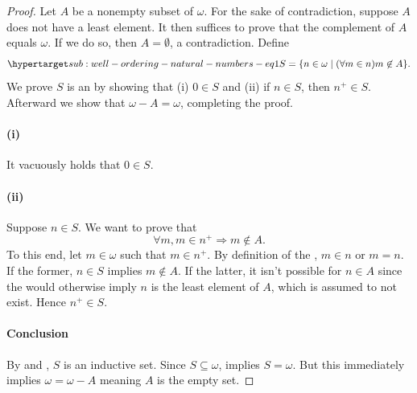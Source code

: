 \documentclass{report}
\begin{document}
  \begin{proof}

    Let $A$ be a nonempty subset of $\omega$.
    For the sake of contradiction, suppose $A$ does not have a least element.
    It then suffices to prove that the complement of $A$ equals $\omega$.
    If we do so, then $A = \emptyset$, a contradiction.
    Define
      \begin{equation}
        \hyperlabel{sub:well-ordering-natural-numbers-eq1}
        S = \{n \in \omega \mid (\forall m \in n) m \not\in A\}.
      \end{equation}
    We prove $S$ is an  by showing that (i)
      $0 \in S$ and (ii) if $n \in S$, then $n^+ \in S$.
    Afterward we show that $\omega - A = \omega$, completing the proof.

    \paragraph{(i)}%

      It vacuously holds that $0 \in S$.

    \paragraph{(ii)}%

      Suppose $n \in S$.
      We want to prove that $$\forall m, m \in n^+ \Rightarrow m \not\in A.$$
      To this end, let $m \in \omega$ such that $m \in n^+$.
      By definition of the , $m \in n$ or $m = n$.
      If the former, $n \in S$ implies $m \not\in A$.
      If the latter, it isn't possible for $n \in A$ since the
         would otherwise imply
        $n$ is the least element of $A$, which is assumed to not exist.
      Hence $n^+ \in S$.

    \paragraph{Conclusion}%

      By  and
        , $S$ is an inductive set.
      Since $S \subseteq \omega$,  implies $S = \omega$.
      But this immediately implies $\omega = \omega - A$ meaning $A$ is the
        empty set.

  \end{proof}
\end{document}
